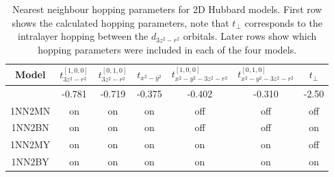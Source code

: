 \documentclass[12pt]{article}
\begin{document}
\begin{table}[h]
    \centering
    \begin{tabular}{|c|c|c|c|c|c|c|}
        \hline
       Model &$t^{[1,0,0]}_{3z^2-r^2}$  &$t^{[0,1,0]}_{3z^2-r^2}$  &  $t_{x^2 - y^2}$ &  $t^{[1,0,0]}_{x^2 - y^2 -3z^2-r^2} $ & $t^{[0,1,0]}_{x^2 - y^2 -3z^2-r^2} $ & $t_{\perp}$ \\
        \hline
        & -0.781 & -0.719  &  -0.375 & -0.402 & -0.310 & -2.50\\
        \hline
        1NN2MN & on &  on  & on  & off & off & off \\
        \hline
        1NN2BN & on &  on  & on  & off & off & on \\
        \hline
        1NN2MY & on &  on  & on  & on & on & off \\
        \hline
        1NN2BY & on &  on  & on  & on & on & on \\    
        \hline
    \end{tabular}
    \caption{Nearest neighbour hopping parameters for 2D Hubbard models. First row shows the calculated hopping parameters, note that  $t_{\perp}$ corresponds to the intralayer hopping between the $d_{3z^2-r^2}$ orbitals. Later rows show which hopping parameters were included in each of the four models.}
    \label{tab:example}
\end{table}

\newpage


\end{document}
